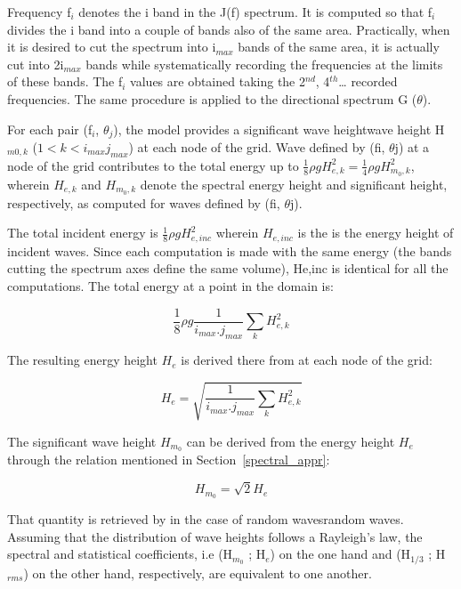 Frequency f${}_{i}$ denotes the i band in the J(f) spectrum. It is computed so
that f${}_{i}$ divides the i band into a couple of bands also of the same area.
Practically, when it is desired to cut the spectrum into i${}_{max}$ bands of
the same area, it is actually cut into 2i${}_{max}$ bands while systematically
recording the frequencies at the limits of these bands. The f${}_{i}$ values
are obtained taking the 2${}^{nd}$, 4${}^{th}${\dots} recorded frequencies. The
same procedure is applied to the directional spectrum G ($\theta$).

For each pair (f${}_{i}$, $\theta_{j}$), the model provides a significant wave
heightwave height H${}_{m0,k}$ ($1 < k < i_{max}j_{max}$) at each node of the
grid. Wave defined by (fi, $\theta$j) at a node of the grid contributes to the
total energy up to $\frac{1}{8}\rho g H^2_{e,k} = \frac{1}{4}\rho gH^2_{m_0, k}$, wherein $H_{e,k}$ and $H_{m_0 ,k}$ denote the
spectral energy height and significant height, respectively, as computed for
waves defined by (fi, $\theta$j).

The total incident energy is $\frac{1}{8}\rho g H^2_{e,inc}$ wherein $H_{e,inc}$
is the is the energy height of incident waves. Since each computation is made
with the same energy (the bands cutting the spectrum axes define the same
volume), He,inc is identical for all the computations. The total energy at a
point in the domain is:

\begin{equation}
  \frac{1}{8}\rho g \frac{1}{i_{max}.j_{max}}\sum_k H^2_{e,k}
  \label{3.66}
\end{equation}

The resulting energy height $H_e$ is derived there from at each node of the
grid:

\begin{equation}
  H_e = \sqrt{\frac{1}{i_{max}.j_{max}}\sum_k H^2_{e,k}}
  \label{3.67}
\end{equation}

The significant wave height $H_{m_0}$ can be derived from the energy height
$H_{e}$ through the relation mentioned in Section~\ref{spectral_appr}:

\[ H_{m_0} = \sqrt{2}H_e\]


That quantity is retrieved by \artemis{} in the case of random wavesrandom
waves. Assuming that the distribution of wave heights follows a Rayleigh's law,
the spectral and statistical coefficients, i.e (H${}_{m_0}$ ;
H${}_{e}$) on the one hand and (H${}_{1/3}$ ; H${}_{rms}$) on the other hand,
respectively, are equivalent to one another.


